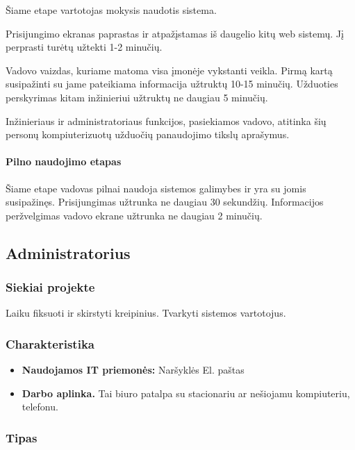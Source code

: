 			Šiame etape vartotojas mokysis naudotis sistema.
			
			Prisijungimo ekranas paprastas ir atpažįstamas iš daugelio kitų web sistemų.
			Jį perprasti turėtų užtekti 1-2 minučių.

			Vadovo vaizdas, kuriame matoma visa įmonėje vykstanti veikla.
			Pirmą kartą susipažinti su jame pateikiama informacija užtruktų 10-15 minučių.
			Užduoties perskyrimas kitam inžinieriui užtruktų ne daugiau 5 minučių.
						
			Inžinieriaus ir administratoriaus funkcijos, pasiekiamos vadovo, atitinka šių personų kompiuterizuotų užduočių panaudojimo tikslų aprašymus.
			
						
			\setcounter{tocdepth}{5} \setcounter{secnumdepth}{5}
			
			\paragraph{Pilno naudojimo etapas}
			
			Šiame etape vadovas pilnai naudoja sistemos galimybes ir yra su jomis susipažinęs.
			Prisijungimas užtrunka ne daugiau 30 sekundžių. Informacijos peržvelgimas vadovo ekrane užtrunka ne daugiau 2 minučių.
			
			
	\subsection{Administratorius}
	
		\subsubsection{Siekiai projekte}
		
		Laiku fiksuoti ir skirstyti kreipinius. Tvarkyti sistemos vartotojus. 
		
		
		\subsubsection{Charakteristika}
		
		\begin{itemize}
			\item \textbf{Naudojamos IT priemonės:}
				\subitem Naršyklės
				\subitem El. paštas
			\item \textbf{Darbo aplinka.}
			Tai biuro patalpa su stacionariu ar nešiojamu kompiuteriu, telefonu.
		\end{itemize}

			
		\subsubsection{Tipas}
		

